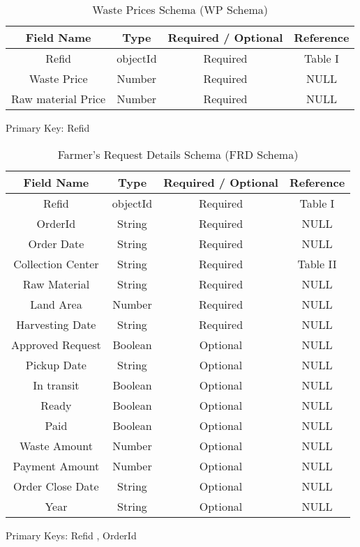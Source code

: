 \documentclass[conference]{IEEEtran}
\begin{document}
\begin{table}[htbp]
\caption{Waste Prices Schema (WP Schema)}
\centering
\begin{tabular}{|c|c|c|c|} 
\hline
\textbf{Field Name} & \textbf{Type}& \textbf{Required / Optional}  &\textbf{Reference}\\
\hline
Refid & objectId & Required & Table I\\
\hline
Waste Price & Number & Required & NULL\\
\hline
Raw material Price & Number & Required & NULL\\
\hline
\end{tabular}
\label{table3}
\begin{center}
Primary Key: Refid 
\end{center}
\end{table}
\raggedbottom

\begin{table}[htbp]
\caption{Farmer's Request Details Schema (FRD Schema)}
\centering
\begin{tabular}{|c|c|c|c|} 
\hline
\textbf{Field Name} & \textbf{Type}& \textbf{Required / Optional } & \textbf{Reference} \\
\hline
Refid & objectId & Required & Table I \\
\hline
OrderId & String & Required & NULL \\
\hline
Order Date & String & Required & NULL\\
\hline
Collection Center & String & Required & Table II\\
\hline
Raw Material & String & Required & NULL\\
\hline
Land Area & Number & Required & NULL\\
\hline
Harvesting Date & String & Required & NULL\\
\hline
Approved Request & Boolean & Optional & NULL\\
\hline
Pickup Date & String & Optional & NULL\\
\hline
In transit & Boolean & Optional & NULL\\
\hline
Ready & Boolean & Optional & NULL\\
\hline
Paid & Boolean & Optional & NULL\\
\hline
Waste Amount & Number & Optional & NULL\\
\hline
Payment Amount & Number & Optional & NULL\\
\hline
Order Close Date & String & Optional & NULL\\
\hline
Year & String & Optional & NULL\\
\hline
\end{tabular}
\label{table4}
\begin{center}
Primary Keys: Refid , OrderId
\end{center}
\end{table}
\raggedbottom
\end{document}
